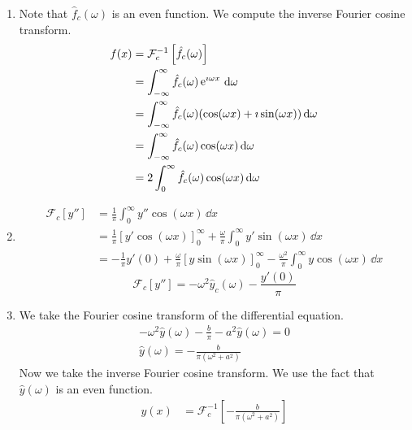 {%
\begin{Solution}
  \label{solution ode ft ifct f''}
  \begin{enumerate}
  \item
    Note that $\hat{f}_c(\omega)$ is an even function.  We compute the inverse 
    Fourier cosine transform.
    \begin{align*}
      f(x)    
      &= \mathcal{F}_c^{-1} \left[ \hat{f}_c(\omega) \right] 
      \\
      &= \int_{-\infty}^\infty \hat{f}_c(\omega) \mathop{\mathrm{e}}\nolimits^{\imath \omega x}\,\mathrm{d} \omega 
      \\
      &= \int_{-\infty}^\infty \hat{f}_c(\omega) (\cos(\omega x) + \imath \sin(\omega x))\,\mathrm{d} \omega 
      \\
      &= \int_{-\infty}^\infty \hat{f}_c(\omega) \cos(\omega x)\,\mathrm{d} \omega 
      \\
      &= 2 \int_0^\infty \hat{f}_c(\omega) \cos(\omega x)\,\mathrm{d} \omega
    \end{align*}
  \item
    \begin{align*}
      \mathcal{F}_c \left[ y'' \right]
      &= \frac{1}{\pi} \int_0^\infty y'' \cos(\omega x)\,\dd x 
      \\
      &= \frac{1}{\pi} \left[ y' \cos(\omega x) \right]_0^\infty 
      + \frac{\omega}{\pi} \int_0^\infty y' \sin(\omega x)\,\dd x 
      \\
      &= - \frac{1}{\pi} y'(0) + \frac{\omega}{\pi} \left[ y \sin(\omega x) \right]_0^\infty 
      - \frac{\omega^2}{\pi} \int_0^\infty y \cos(\omega x)\,\dd x 
    \end{align*}
    \[
    \boxed{
      \mathcal{F}_c[y''] = - \omega^2 \hat{y}_c(\omega) - \frac{y'(0)}{\pi}
      }
    \]
  \item
    We take the Fourier cosine transform of the differential equation.
    \begin{gather*}
      - \omega^2 \hat{y}(\omega) - \frac{b}{\pi} - a^2 \hat{y}(\omega)= 0 
      \\
      \hat{y}(\omega) = - \frac{b}{\pi (\omega^2 + a^2)}
    \end{gather*}
    Now we take the inverse Fourier cosine transform.  We use the fact that
    $\hat{y}(\omega)$ is an even function.
    \begin{align*}
      y(x)
      &= \mathcal{F}_c^{-1} \left[ -\frac{b}{\pi (\omega^2 + a^2)} \right] 

\end{align*}
\end{enumerate}
\end{Solution}}
